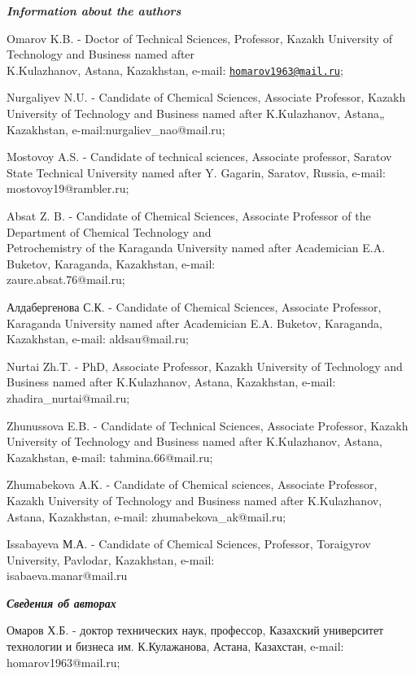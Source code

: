 \begin{authorinfo}
\emph{{\bfseries Information about the authors}}

Omarov K.B. - Doctor of Technical Sciences, Professor, Kazakh University
of Technology and Business named after \\K.Kulazhanov, Astana, Kazakhstan,
e-mail: \href{mailto:homarov1963@mail.ru}{\nolinkurl{homarov1963@mail.ru}};

Nurgaliyev N.U. - Candidate of Chemical Sciences, Associate Professor,
Kazakh University of Technology and Business named after K.Kulazhanov,
Astana„ Kazakhstan, e-mail:nurgaliev\_nao@mail.ru;

Mostovoy A.S. - Candidate of technical sciences, Associate professor,
Saratov State Technical University named after Y. Gagarin, Saratov,
Russia, e-mail: mostovoy19@rambler.ru;

Absat Z. B. - Candidate of Chemical Sciences, Associate
Professor of the Department of Chemical Technology and \\Petrochemistry of
the Karaganda University named after Academician E.A. Buketov,
Karaganda, Kazakhstan, e-mail:\\ zaure.absat.76@mail.ru;

Алдабергенова С.К. - Candidate of Chemical Sciences, Associate
Professor, Karaganda University named after Academician E.A. Buketov,
Karaganda, Kazakhstan, e-mail: aldsau@mail.ru;

Nurtai Zh.T. - PhD, Associate Professor, Kazakh University of Technology
and Business named after K.Kulazhanov, Astana, Kazakhstan, e-mail:
zhadira\_nurtai@mail.ru;

Zhunussova E.B. - Candidate of Technical Sciences, Associate Professor,
Kazakh University of Technology and Business named after K.Kulazhanov,
Astana, Kazakhstan, е-mail: tahmina.66@mail.ru;

Zhumabekova A.K. - Candidate of Chemical sciences, Associate Professor,
Kazakh University of Technology and Business named after K.Kulazhanov,
Astana, Kazakhstan, e-mail: zhumabekova\_ak@mail.ru;

Issabayeva М.А. - Candidate of Chemical Sciences, Professor, Toraigyrov
University, Pavlodar, Kazakhstan, e-mail:\\ isabaeva.manar@mail.ru

\emph{{\bfseries Сведения об авторах}}

Омаров Х.Б. - доктор технических наук, профессор, Казахский университет
технологии и бизнеса им. К.Кулажанова, Астана, Казахстан, e-mail:
homarov1963@mail.ru;


\end{authorinfo}
